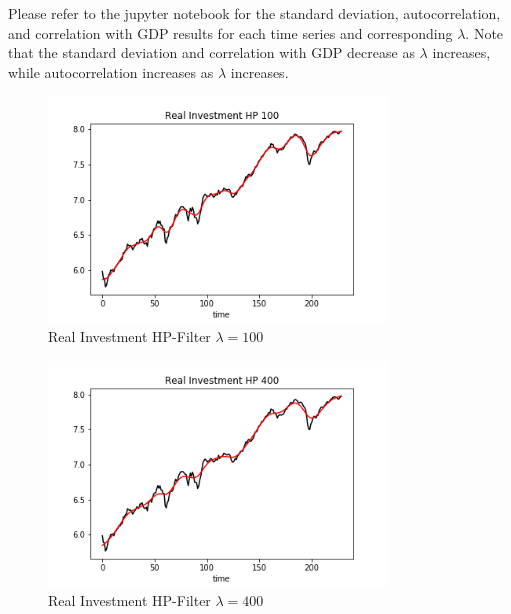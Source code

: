 \documentclass[letterpaper,11pt]{article}
\theoremstyle{definition}
\begin{document}
\begin{spacing}{1.5}
    \begin{Exercise} \label{Filter_HW_Moments_HP}
        Please refer to the jupyter notebook for the standard deviation, autocorrelation, and correlation with GDP results for each time series and corresponding $\lambda$. Note that the standard deviation and correlation with GDP decrease as $\lambda$ increases, while autocorrelation increases as $\lambda$ increases.

				\begin{figure}[H]
					\caption{Real Investment HP-Filter $\lambda=100$}
					\label{fig:real_IN100}
					\includegraphics[width=0.8\textwidth]{Real_IN_HP100.png}
				\end{figure}

				\begin{figure}[H]
					\caption{Real Investment HP-Filter $\lambda=400$}
					\label{fig:real_IN400}
					\includegraphics[width=0.8\textwidth]{Real_IN_HP400.png}
				\end{figure}


\end{Exercise}
\end{spacing}
\end{document}
